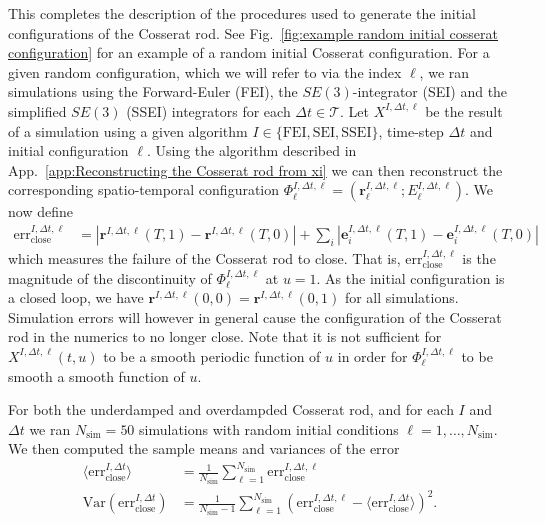 \documentclass[]{cam-thesis}
\begin{document}
This completes the description of the procedures used to generate the initial configurations of the Cosserat rod. See Fig.~\ref{fig:example random initial cosserat configuration} for an example of a random initial Cosserat configuration. For a given random configuration, which we will refer to via the index $\ell$, we ran simulations using the Forward-Euler (FEI), the $SE(3)$-integrator (SEI) and the simplified $SE(3)$ (SSEI) integrators for each $\Delta t \in \mathcal{T}$. Let $X^{I,\Delta t,\ell}$ be the result of a simulation using a given algorithm $I \in \{ \text{FEI}, \text{SEI}, \text{SSEI} \}$, time-step $\Delta t$ and initial configuration $\ell$. Using the algorithm described in App.~\ref{app:Reconstructing the Cosserat rod from xi} we can then reconstruct the corresponding spatio-temporal configuration $\Phi_\ell^{I,\Delta t,\ell} = (\mathbf{r}_\ell^{I, \Delta t,\ell} ; E_\ell^{I, \Delta t,\ell})$. We now define
\begin{subequations}
	\begin{align}
		\text{err}_\text{close}^{I, \Delta t, \ell} & = 
			|\mathbf{r}^{I, \Delta t, \ell}(T, 1) - \mathbf{r}^{I, \Delta t, \ell}(T, 0)|
			+ \sum_i |\mathbf{e}_i^{I, \Delta t, \ell}(T, 1) - \mathbf{e}_i^{I, \Delta t, \ell}(T, 0)|   \label{eq:cosserat close error}
	\end{align}
\end{subequations}
which measures the failure of the Cosserat rod to close. That is, $\text{err}_\text{close}^{I, \Delta t, \ell}$ is the magnitude of the discontinuity of $\Phi_\ell^{I,\Delta t,\ell}$ at $u=1$. As the initial configuration is a closed loop, we have $\mathbf{r}^{I, \Delta t, \ell}(0, 0) = \mathbf{r}^{I, \Delta t, \ell}(0, 1)$ for all simulations. Simulation errors will however in general cause the configuration of the Cosserat rod in the numerics to no longer close. Note that it is not sufficient for $X^{I,\Delta t,\ell}(t,u)$ to be a smooth periodic function of $u$ in order for $\Phi_\ell^{I,\Delta t,\ell}$ to be smooth a smooth function of $u$.

For both the underdamped and overdampded Cosserat rod, and for each $I$ and $\Delta t$ we ran $N_\text{sim} = 50$ simulations with random initial conditions $\ell = 1,\dots, N_\text{sim}$. We then computed the sample means and variances of the error
\begin{subequations}
	\begin{align}
		\langle \text{err}_\text{close}^{I, \Delta t} \rangle & = \frac{1}{N_\text{sim}} \sum_{\ell = 1}^{N_\text{sim}} \text{err}_\text{close}^{I, \Delta t, \ell} \\
		\text{Var}( \text{err}_\text{close}^{I, \Delta t}) & = \frac{1}{N_\text{sim}-1} \sum_{\ell = 1}^{N_\text{sim}} ( \text{err}_\text{close}^{I, \Delta t, \ell} - \langle \text{err}_\text{close}^{I, \Delta t} \rangle)^2.
	\end{align}
\end{subequations}
\end{document}

